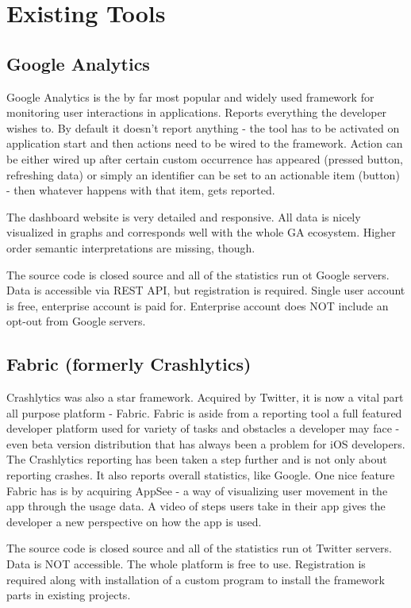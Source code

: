 \section{Existing Tools}

\subsection{Google Analytics}

Google Analytics is the by far most popular and widely used framework for monitoring user interactions in applications. Reports everything the developer wishes to. By default it doesn't report anything - the tool has to be activated on application start and then actions need to be wired to the framework. Action can be either wired up after certain custom occurrence has appeared (pressed button, refreshing data) or simply an identifier can be set to an actionable item (button) - then whatever happens with that item, gets reported.

The dashboard website is very detailed and responsive. All data is nicely visualized in graphs and corresponds well with the whole GA ecosystem. Higher order semantic interpretations are missing, though.

The source code is closed source and all of the statistics run ot Google servers. Data is accessible via REST API, but registration is required. Single user account is free, enterprise account is paid for. Enterprise account does NOT include an opt-out from Google servers.


\subsection{Fabric (formerly Crashlytics)}

Crashlytics was also a star framework. Acquired by Twitter, it is now a vital part all purpose platform - Fabric. Fabric is aside from a reporting tool a full featured developer platform used for variety of tasks and obstacles a developer may face - even beta version distribution that has always been a problem for iOS developers. The Crashlytics reporting has been taken a step further and is not only about reporting crashes. It also reports overall statistics, like Google. One nice feature Fabric has is by acquiring AppSee - a way of visualizing user movement in the app through the usage data. A video of steps users take in their app gives the developer a new perspective on how the app is used.

The source code is closed source and all of the statistics run ot Twitter servers. Data is NOT accessible. The whole platform is free to use. Registration is required along with installation of a custom program to install the framework parts in existing projects.



